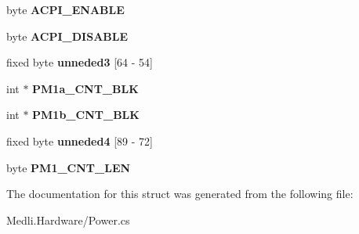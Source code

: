 \begin{DoxyCompactItemize}
byte {\bfseries A\+C\+P\+I\+\_\+\+E\+N\+A\+B\+LE}
\item 
\mbox{\label{struct_medli_1_1_hardware_1_1_a_c_p_i_1_1_f_a_c_p_a502ff5abd164589bcc097351149f8b8c}} 
byte {\bfseries A\+C\+P\+I\+\_\+\+D\+I\+S\+A\+B\+LE}
\item 
\mbox{\label{struct_medli_1_1_hardware_1_1_a_c_p_i_1_1_f_a_c_p_ac5d9043dfe2411502c137fdacb8345ee}} 
fixed byte {\bfseries unneded3} \mbox{[}64 -\/ 54\mbox{]}
\item 
\mbox{\label{struct_medli_1_1_hardware_1_1_a_c_p_i_1_1_f_a_c_p_a6104199943d7193b87a60049d423451a}} 
int $\ast$ {\bfseries P\+M1a\+\_\+\+C\+N\+T\+\_\+\+B\+LK}
\item 
\mbox{\label{struct_medli_1_1_hardware_1_1_a_c_p_i_1_1_f_a_c_p_a432fca42fd7046c6a63f417caf22566c}} 
int $\ast$ {\bfseries P\+M1b\+\_\+\+C\+N\+T\+\_\+\+B\+LK}
\item 
\mbox{\label{struct_medli_1_1_hardware_1_1_a_c_p_i_1_1_f_a_c_p_a6d84b10c229ff2e5ee4dc605653b3b21}} 
fixed byte {\bfseries unneded4} \mbox{[}89 -\/ 72\mbox{]}
\item 
\mbox{\label{struct_medli_1_1_hardware_1_1_a_c_p_i_1_1_f_a_c_p_aa2a706c02a3af6eaef54fcbb95e55e25}} 
byte {\bfseries P\+M1\+\_\+\+C\+N\+T\+\_\+\+L\+EN}
\end{DoxyCompactItemize}


The documentation for this struct was generated from the following file\+:\begin{DoxyCompactItemize}
\item 
Medli.\+Hardware/Power.\+cs\end{DoxyCompactItemize}
